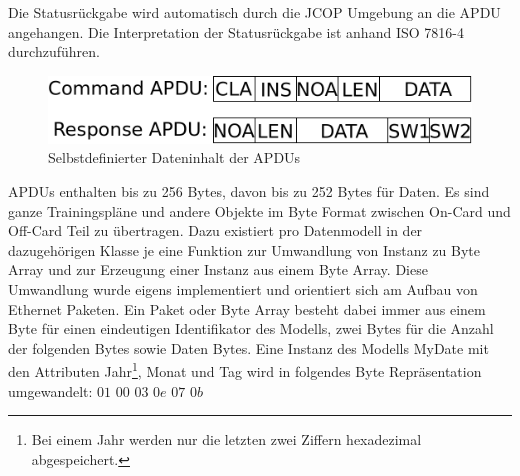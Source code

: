 Die Statusrückgabe wird automatisch durch die JCOP Umgebung an die APDU angehangen. Die Interpretation der Statusrückgabe ist anhand ISO 7816-4 durchzuführen.

\begin{figure}[htb]
\begin{center}
 \includegraphics[width=1\hsize]{./images/myapdu.png}
\end{center}
\caption[Selbstdefinierter Dateninhalt der APDUs]{\label{myapdu}Selbstdefinierter Dateninhalt der APDUs}
\end{figure}

APDUs enthalten bis zu 256 Bytes, davon bis zu 252 Bytes für Daten.
Es sind ganze Trainingspläne und andere Objekte im Byte Format zwischen On-Card und Off-Card Teil zu übertragen. Dazu existiert pro Datenmodell in der dazugehörigen Klasse je eine Funktion zur Umwandlung von Instanz zu Byte Array und zur Erzeugung einer Instanz aus einem Byte Array. Diese Umwandlung  wurde eigens implementiert und orientiert sich am Aufbau von Ethernet Paketen. Ein Paket oder Byte Array besteht dabei immer aus einem Byte für einen eindeutigen Identifikator des Modells, zwei Bytes für die Anzahl der folgenden Bytes sowie Daten Bytes.
Eine Instanz des Modells MyDate mit den Attributen Jahr\footnote{Bei einem Jahr werden nur die letzten zwei Ziffern hexadezimal abgespeichert.}, Monat und Tag wird in folgendes Byte Repräsentation umgewandelt: $01$ $00$ $03$ $0e$ $07$ $0b$

